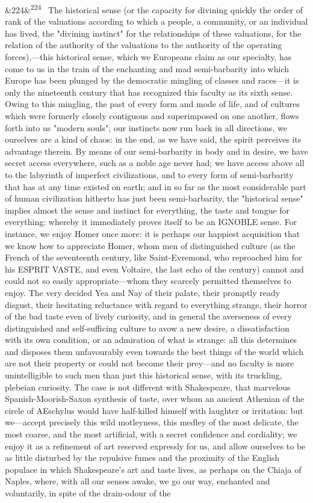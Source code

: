 \documentclass[12pt]{article}
\newcommand{\para}[1][]{\par\noindent\ifx&#1&\else\textsuperscript{\footnotesize #1}~\fi}
\begin{document}
\para[224] The historical sense (or the capacity for divining quickly the order of rank of the valuations according to which a people, a community, or an individual has lived, the "divining instinct" for the relationships of these valuations, for the relation of the authority of the valuations to the authority of the operating forces),---this historical sense, which we Europeans claim as our specialty, has come to us in the train of the enchanting and mad semi-barbarity into which Europe has been plunged by the democratic mingling of classes and races---it is only the nineteenth century that has recognized this faculty as its sixth sense. Owing to this mingling, the past of every form and mode of life, and of cultures which were formerly closely contiguous and superimposed on one another, flows forth into us "modern souls"; our instincts now run back in all directions, we ourselves are a kind of chaos: in the end, as we have said, the spirit perceives its advantage therein. By means of our semi-barbarity in body and in desire, we have secret access everywhere, such as a noble age never had; we have access above all to the labyrinth of imperfect civilizations, and to every form of semi-barbarity that has at any time existed on earth; and in so far as the most considerable part of human civilization hitherto has just been semi-barbarity, the "historical sense" implies almost the sense and instinct for everything, the taste and tongue for everything: whereby it immediately proves itself to be an IGNOBLE sense. For instance, we enjoy Homer once more: it is perhaps our happiest acquisition that we know how to appreciate Homer, whom men of distinguished culture (as the French of the seventeenth century, like Saint-Evremond, who reproached him for his ESPRIT VASTE, and even Voltaire, the last echo of the century) cannot and could not so easily appropriate---whom they scarcely permitted themselves to enjoy. The very decided Yea and Nay of their palate, their promptly ready disgust, their hesitating reluctance with regard to everything strange, their horror of the bad taste even of lively curiosity, and in general the averseness of every distinguished and self-sufficing culture to avow a new desire, a dissatisfaction with its own condition, or an admiration of what is strange: all this determines and disposes them unfavourably even towards the best things of the world which are not their property or could not become their prey---and no faculty is more unintelligible to such men than just this historical sense, with its truckling, plebeian curiosity. The case is not different with Shakespeare, that marvelous Spanish-Moorish-Saxon synthesis of taste, over whom an ancient Athenian of the circle of AEschylus would have half-killed himself with laughter or irritation: but we---accept precisely this wild motleyness, this medley of the most delicate, the most coarse, and the most artificial, with a secret confidence and cordiality; we enjoy it as a refinement of art reserved expressly for us, and allow ourselves to be as little disturbed by the repulsive fumes and the proximity of the English populace in which Shakespeare's art and taste lives, as perhaps on the Chiaja of Naples, where, with all our senses awake, we go our way, enchanted and voluntarily, in spite of the drain-odour of the 
\end{document}
